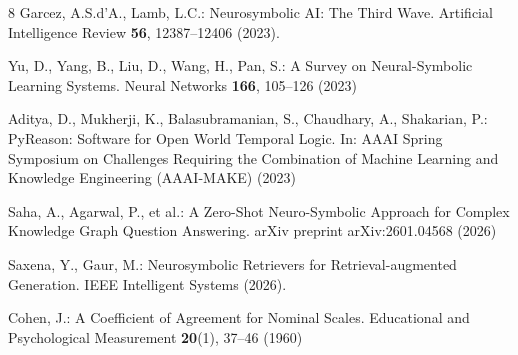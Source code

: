 \documentclass[runningheads]{llncs}
\begin{document}
\begin{thebibliography}{8}
Garcez, A.S.d'A., Lamb, L.C.:
Neurosymbolic AI: The Third Wave.
Artificial Intelligence Review \textbf{56}, 12387--12406 (2023).

Yu, D., Yang, B., Liu, D., Wang, H., Pan, S.:
A Survey on Neural-Symbolic Learning Systems.
Neural Networks \textbf{166}, 105--126 (2023)

Aditya, D., Mukherji, K., Balasubramanian, S., Chaudhary, A., Shakarian, P.:
PyReason: Software for Open World Temporal Logic.
In: AAAI Spring Symposium on Challenges Requiring the Combination of Machine Learning and Knowledge Engineering (AAAI-MAKE) (2023)

Saha, A., Agarwal, P., et al.:
A Zero-Shot Neuro-Symbolic Approach for Complex Knowledge Graph Question Answering.
arXiv preprint arXiv:2601.04568 (2026)

Saxena, Y., Gaur, M.:
Neurosymbolic Retrievers for Retrieval-augmented Generation.
IEEE Intelligent Systems (2026).

Cohen, J.:
A Coefficient of Agreement for Nominal Scales.
Educational and Psychological Measurement \textbf{20}(1), 37--46 (1960)

\end{thebibliography}
\end{document}
